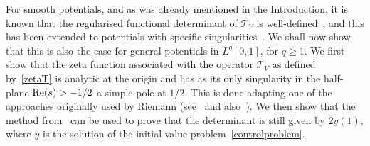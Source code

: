 \documentclass[11pt]{article}
\theoremstyle{plain}
\theoremstyle{definition}
\newcommand{\ttt}{\mathscr{T}}
\let\balpha q
\begin{document}
For smooth potentials, and as was already mentioned in the Introduction, it is known that the regularised functional determinant of $\ttt_V$ is
well-defined~\cite{BFK,Levit-Smilansky}, and this has been extended to potentials with specific singularities~\cite{Lesch,Lesch-Tolk}.
We shall now show that this is also the case for general potentials in $L^\balpha[0,1]$, for $\balpha\geq 1$. We first show that the
zeta function associated with the operator $\ttt_V$ as defined by~\eqref{zetaT} is analytic at the origin and has as its only singularity
in the half-plane $\re(s)>-1/2$ a simple pole at $1/2$. This is done adapting one of the approaches originally used by Riemann (see~\cite{riem}
and also~\cite[p.\,21ff]{titc}). We then show that the method from~\cite{Levit-Smilansky} can be used to prove that the determinant is still given by $2y(1)$,
where $y$ is the solution of the initial value problem~\eqref{controlproblem}.
\end{document}
